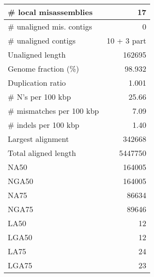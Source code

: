 \documentclass[12pt,a4paper]{article}
\begin{document}
\begin{table}[ht]
\begin{center}
\begin{tabular}{|l*{1}{|r}|}
\# local misassemblies & 17 \\ \hline
\# unaligned mis. contigs & 0 \\ \hline
\# unaligned contigs & 10 + 3 part \\ \hline
Unaligned length & 162695 \\ \hline
Genome fraction (\%) & 98.932 \\ \hline
Duplication ratio & 1.001 \\ \hline
\# N's per 100 kbp & 25.66 \\ \hline
\# mismatches per 100 kbp & 7.09 \\ \hline
\# indels per 100 kbp & 1.40 \\ \hline
Largest alignment & 342668 \\ \hline
Total aligned length & 5447750 \\ \hline
NA50 & 164005 \\ \hline
NGA50 & 164005 \\ \hline
NA75 & 86634 \\ \hline
NGA75 & 89646 \\ \hline
LA50 & 12 \\ \hline
LGA50 & 12 \\ \hline
LA75 & 24 \\ \hline
LGA75 & 23 \\ \hline
\end{tabular}
\end{center}
\end{table}
\end{document}
